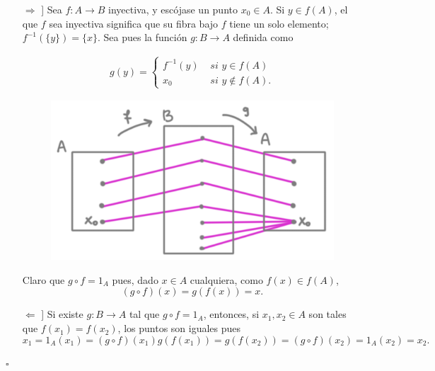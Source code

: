 \documentclass[10pt]{article}
\newcommand*{\QEDB}{\null\nobreak\hfill\ensuremath{\square}}%
\newtheorem[M]{teo}{Teorema}[section]
\newtheorem[M]{listaObj}[teo]{Lista de deseos}
\newtheorem[M]{preg}[teo]{Pregunta}
\newtheorem[M]{lema}[teo]{Lema}
\newtheorem[M]{hip}[teo]{Hipótesis}
\newtheorem[M]{prop}[teo]{Proposición}
\newtheorem[M]{obs}[teo]{Observación}
\newtheorem[M]{cor}[teo]{Corolario}
\newtheorem[M]{notacion}[teo]{Notación}
\newtheorem[M]{nota}[teo]{Nota}
\begin{document}
\begin{itemize}
	\item[$\Rightarrow$]] Sea $f: A \longrightarrow B$ inyectiva, y escójase
	un punto $x_{0} \in A$. Si $y \in f(A)$, el que $f$ sea inyectiva 
	significa que su fibra bajo $f$ tiene un solo elemento;
	$f^{-1}(\{ y \}) = \{ x \}$. Sea pues la función
	$g: B \longrightarrow A$ definida como
	
	\begin{minipage}{0.5\textwidth}
		
		\begin{align*}
	g(y) = \begin{cases}
	f^{-1}(y) & \textit{ si } y \in f(A) \\
	x_{0} & \textit{ si } y \not\in f(A).
	\end{cases}
	\end{align*}
		
		\end{minipage} \hfill
		\begin{minipage}{0.45\textwidth}
		\begin{figure}[H]
	\centering
		\includegraphics[scale=2.6]{cat1}
	 \end{figure}
		
		\end{minipage}
			
			Claro que $g \circ f = 1_{A}$ pues, dado $x \in A$ 
			cualquiera, como $f(x) \in f(A)$,
			\[
			(g \circ f)(x) = g (f(x)) = x.
			\]
	\item[$\Leftarrow$]] Si existe $g: B \longrightarrow A$ tal que 
	$g \circ f = 1_{A}$, entonces, si $x_{1}, x_{2} \in A$
	son tales que $f(x_{1}) = f(x_{2})$, los puntos son iguales pues
	\[
	x_{1} = 1_{A}(x_{1}) = (g \circ f)(x_{1})
	g (f(x_{1})) = g (f(x_{2})) = (g \circ f)(x_{2}) = 1_{A}(x_{2}) = x_{2}.
	\] 
\end{itemize}
\QEDB
\vspace{0.2cm}
\end{document}
